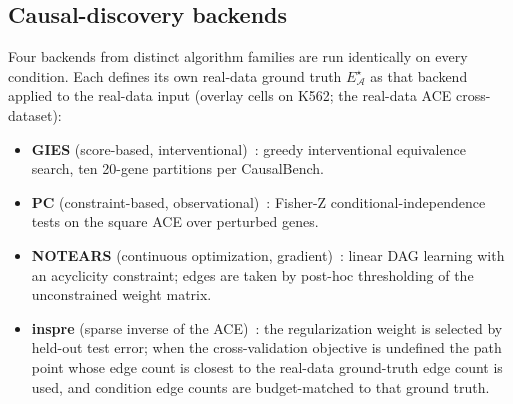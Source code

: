 \documentclass{article}
\theoremstyle{plain}
\theoremstyle{definition}
\theoremstyle{remark}
\begin{document}
\subsection{Causal-discovery backends}
Four backends from distinct algorithm families are run identically on every condition. Each defines its own real-data ground truth $E^{\star}_{\mathcal{A}}$ as that backend applied to the real-data input (overlay cells on K562; the real-data ACE cross-dataset):
\begin{itemize}
\item \textbf{GIES} (score-based, interventional)~\citep{hauser2012gies}: greedy interventional equivalence search, ten 20-gene partitions per CausalBench.
\item \textbf{PC} (constraint-based, observational)~\citep{spirtes2000}: Fisher-Z conditional-independence tests on the square ACE over perturbed genes.
\item \textbf{NOTEARS} (continuous optimization, gradient)~\citep{zheng2018notears}: linear DAG learning with an acyclicity constraint; edges are taken by post-hoc thresholding of the unconstrained weight matrix.
\item \textbf{inspre} (sparse inverse of the ACE)~\citep{brown2025inspre}: the regularization weight is selected by held-out test error; when the cross-validation objective is undefined the path point whose edge count is closest to the real-data ground-truth edge count is used, and condition edge counts are budget-matched to that ground truth.
\end{itemize}
\end{document}
